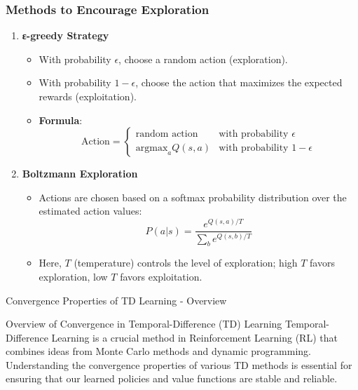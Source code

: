 \documentclass[aspectratio=169]{beamer}
\begin{document}
\begin{frame}[fragile]
    \frametitle{Methods to Encourage Exploration}
    \begin{enumerate}
        \item \textbf{ε-greedy Strategy}
            \begin{itemize}
                \item With probability $\epsilon$, choose a random action (exploration).
                \item With probability $1-\epsilon$, choose the action that maximizes the expected rewards (exploitation).
                \item \textbf{Formula}:
                \begin{equation}
                \text{Action} = 
                \begin{cases} 
                \text{random action} & \text{with probability } \epsilon \\ 
                \text{argmax}_a Q(s, a) & \text{with probability } 1 - \epsilon 
                \end{cases}
                \end{equation}
            \end{itemize}
        
        \item \textbf{Boltzmann Exploration}
            \begin{itemize}
                \item Actions are chosen based on a softmax probability distribution over the estimated action values:
                \begin{equation}
                P(a|s) = \frac{e^{Q(s,a)/T}}{\sum_{b} e^{Q(s,b)/T}}
                \end{equation}
                \item Here, $T$ (temperature) controls the level of exploration; high $T$ favors exploration, low $T$ favors exploitation.
            \end{itemize}
    \end{enumerate}
\end{frame}

\begin{frame}[fragile]{Convergence Properties of TD Learning - Overview}
    \begin{block}{Overview of Convergence in Temporal-Difference (TD) Learning}
        Temporal-Difference Learning is a crucial method in Reinforcement Learning (RL) that combines ideas from Monte Carlo methods and dynamic programming. Understanding the convergence properties of various TD methods is essential for ensuring that our learned policies and value functions are stable and reliable.
    \end{block}
\end{frame}
\end{document}
